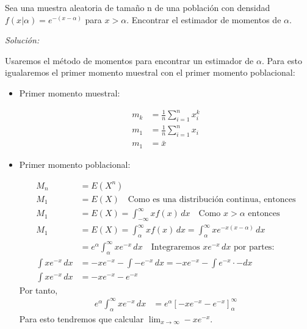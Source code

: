 \documentclass[12pt]{article}
\newenvironment{problem}[2][Problema]{\begin{trivlist}
\item[\hskip \labelsep {\bfseries #1}\hskip \labelsep {\bfseries #2.}]}{\end{trivlist}}
\newenvironment{sol}
    {\emph{Solución:}
    }
    {
    }
\begin{document}




\begin{problem}{I} 
Sea una muestra aleatoria de tamaño n de una población con densidad\\ $f(x|\alpha)=e^{-(x-\alpha)}$ para $x>\alpha$. Encontrar el estimador de momentos de $\alpha$.
\end{problem}
\begin{sol}

Usaremos el método de momentos para encontrar un estimador de $\alpha$. Para esto igualaremos el primer momento muestral con el primer momento poblacional:

\begin{itemize}

\item Primer momento muestral:

\begin{align*}
	m_k &= \frac{1}{n} \sum_{i=1}^{n}x_i^k \\
	m_1 &= \frac{1}{n} \sum_{i=1}^{n}x_i \\
	m_1 &= \bar{x}
\end{align*}
	
\item Primer momento poblacional:

\begin{align*}
    M_n &= E(X^n) \\
    M_1 &= E(X) \quad \text{Como es una distribución continua, entonces} \\
    M_1 &= E(X) = \int_{-\infty}^{\infty} x f(x) \, dx \quad \text{Como }x>\alpha \text{ entonces} \\
    M_1 &= E(X) = \int_{\alpha}^{\infty} x f(x) \, dx = \int_{\alpha}^{\infty} xe^{-x(x-\alpha)} \, dx \\
    &=  e^\alpha \int_{\alpha}^{\infty} xe^{-x} \, dx \quad \text{Integraremos }xe^{-x} \, dx \text{ por partes:} \\
   \int xe^{-x} \, dx  &= -xe^{-x}- \int -e^{-x} \, dx = -xe^{-x}- \int e^{-x} \cdot - dx \\
   \int xe^{-x} \, dx &= -xe^{-x}-e^{-x}
\end{align*}
Por tanto,
\begin{align*}
 e^\alpha \int_{\alpha}^{\infty} xe^{-x} \, dx  &= e^\alpha \left[ -xe^{-x}-e^{-x} \right]_\alpha^\infty
\end{align*}
Para esto tendremos que calcular $\lim_{x \to \infty} -xe^{-x}$. \pagebreak



\end{itemize}
\end{sol}
\end{document}
